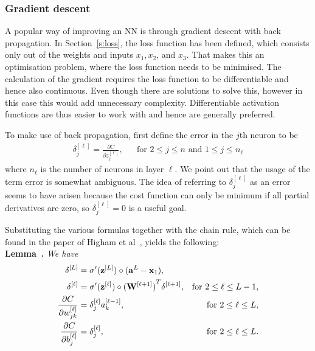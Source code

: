 \subsubsection{Gradient descent}
A popular way of improving an NN is through gradient descent with back propagation.
In Section~\ref{s:loss}, the loss function has been defined, which consists only out of the weights and inputs \(x_1, x_2\), and \(x_3\).
That makes this an optimisation problem, where the loss function needs to be minimised.
The calculation of the gradient requires the loss function to be differentiable and hence also continuous.
Even though there are solutions to solve this, however in this case this would add unnecessary complexity.
Differentiable activation functions are thus easier to work with and hence are generally preferred.

To make use of back propagation, first define the error in the \(j\)th neuron to be
\begin{align*}
    \delta^{[\ell]}_j = \frac{\partial C}{\partial z^{[\ell]}_j}, &  & \text{for } 2\leq j\leq n \text{ and }1 \leq j \leq n_\ell
\end{align*}
where \(n_\ell \) is the number of neurons in layer \(\ell \).
We point out that the usage of the term error is somewhat ambiguous.
The idea of referring to \(\delta^{[\ell]}_j\) as an error seems to have arisen because the cost function can only be minimum if all partial derivatives are zero, so \(\delta^{[\ell]}_j = 0\) is a useful goal.

Substituting the various formulas together with the chain rule, which can be found in the paper of Higham et al~\cite{Higham2018}, yields the following:\\
\textbf{Lemma~\cite{Higham2018}. }\textit{We have
    \begin{align}
        \vec{\delta}^{[L]}
         & = \sigma'(\vec{z}^{[L]})\circ (\vec{a}^L - \vec{x}_1),                                 \\
        \vec{\delta}^{[\ell]}
         & = \sigma'(\vec{z}^{[\ell]})\circ {(\vec{W}^{[\ell + 1]})}^T \vec{\delta}^{[\ell + 1]},
         & \textnormal{for }2\leq \ell \leq L -1,                                                 \\
        \frac{\partial C}{\partial w^{[\ell]}_{jk}}
         & = \delta^{[\ell]}_j a^{[\ell - 1]}_k,
         & \textnormal{for }2\leq \ell \leq L,\label{l:cw}                                        \\
        \frac{\partial C}{\partial b^{[\ell]}_j}
         & = \delta^{[\ell]}_j,
         & \textnormal{for }2\leq \ell \leq L.\label{l:cb}
    \end{align}}

